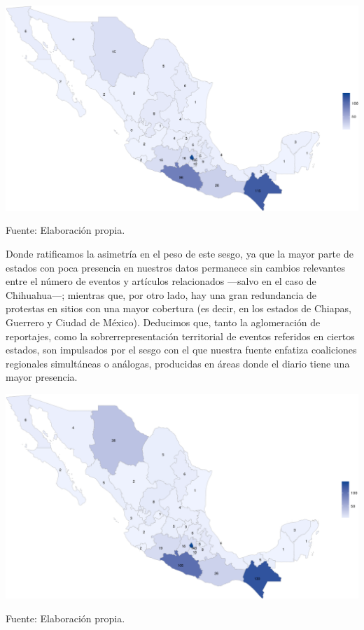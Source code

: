 \documentclass[letterpaper, 11pt]{book}
\theoremstyle{definition}
\theoremstyle{remark}
\begin{document}
\hspace{-1em}\begin{minipage}{\linewidth}
\centering
{} \label{3.4_noticiasEstados}
\hspace{-1.5em}\includegraphics[scale=0.55]{img/3.4_noticiasEstados.png}
\par
\small Fuente: Elaboración propia.
\end{minipage}\bigskip

Donde ratificamos la asimetría en el peso de este sesgo, ya que la mayor parte de estados con poca presencia en nuestros datos permanece sin cambios relevantes entre el número de eventos y artículos relacionados ---salvo en el caso de Chihuahua---; mientras que, por otro lado, hay una gran redundancia de protestas en sitios con una mayor cobertura (es decir, en los estados de Chiapas, Guerrero y Ciudad de México). 
Deducimos que, tanto la aglomeración de reportajes, como la sobrerrepresentación territorial de eventos referidos en ciertos estados, son impulsados por el sesgo con el que nuestra fuente enfatiza coaliciones regionales simultáneas o análogas, producidas en áreas donde el diario tiene una mayor presencia. 



\hspace{-1em}\begin{minipage}{\linewidth}
\centering
{} \label{3.5_epsEstados}
\hspace{-1.5em}\includegraphics[scale=0.55]{img/3.5_epsEstados.png}
\par
\small Fuente: Elaboración propia.
\end{minipage}\bigskip
\end{document}
